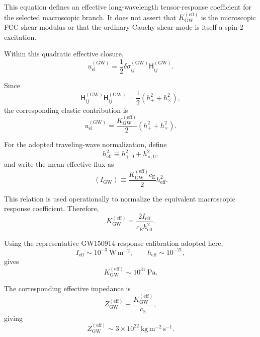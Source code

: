 This equation defines an effective long-wavelength tensor-response coefficient for the selected macroscopic branch. It does not assert that $K_{\mathrm{GW}}^{(\mathrm{eff})}$ is the microscopic FCC shear modulus or that the ordinary Cauchy shear mode is itself a spin-2 excitation.

Within this quadratic effective closure,
\begin{equation}
    u_{\mathrm{el}}^{(\mathrm{GW})} = \frac{1}{2} \delta\sigma_{ij}^{(\mathrm{GW})} \mathsf{H}_{ij}^{(\mathrm{GW})}.
\end{equation}

Since
\begin{equation}
    \mathsf{H}_{ij}^{(\mathrm{GW})} \mathsf{H}_{ij}^{(\mathrm{GW})} = \frac{1}{2} \left( h_{+}^2+h_{\times}^2 \right),
\end{equation}
the corresponding elastic contribution is
\begin{equation}
    u_{\mathrm{el}}^{(\mathrm{GW})} = \frac{ K_{\mathrm{GW}}^{(\mathrm{eff})} }{2} \left( h_{+}^2+h_{\times}^2 \right).
\end{equation}

For the adopted traveling-wave normalization, define
\begin{equation}
    h_{\mathrm{eff}}^2 \equiv h_{+,0}^2 + h_{\times,0}^2,
\end{equation}
and write the mean effective flux as
\begin{equation}
    \left\langle I_{\mathrm{GW}}\right\rangle \equiv \frac{ K_{\mathrm{GW}}^{(\mathrm{eff})}c_{\mathrm{E}} }{2} h_{\mathrm{eff}}^2.
\end{equation}

This relation is used operationally to normalize the equivalent macroscopic response coefficient. Therefore,
\begin{equation}
    K_{\mathrm{GW}}^{(\mathrm{eff})} = \frac{ 2I_{\mathrm{eff}} }{ c_{\mathrm{E}}h_{\mathrm{eff}}^2 }.
\end{equation}

Using the representative GW150914 response calibration adopted here,
\begin{equation}
    I_{\mathrm{eff}} \sim 10^{-3}\ \mathrm{W\,m^{-2}}, \qquad h_{\mathrm{eff}} \sim 10^{-21},
\end{equation}
gives
\begin{equation}
    K_{\mathrm{GW}}^{(\mathrm{eff})} \sim 10^{31}\ \mathrm{Pa}.
\end{equation}

The corresponding effective impedance is
\begin{equation}
    Z_{\mathrm{GW}}^{(\mathrm{eff})} \equiv \frac{ K_{\mathrm{GW}}^{(\mathrm{eff})} }{ c_{\mathrm{E}} },
\end{equation}
giving
\begin{equation}
    Z_{\mathrm{GW}}^{(\mathrm{eff})} \sim 3\times10^{22}\ \mathrm{kg\,m^{-2}\,s^{-1}}.
\end{equation}

